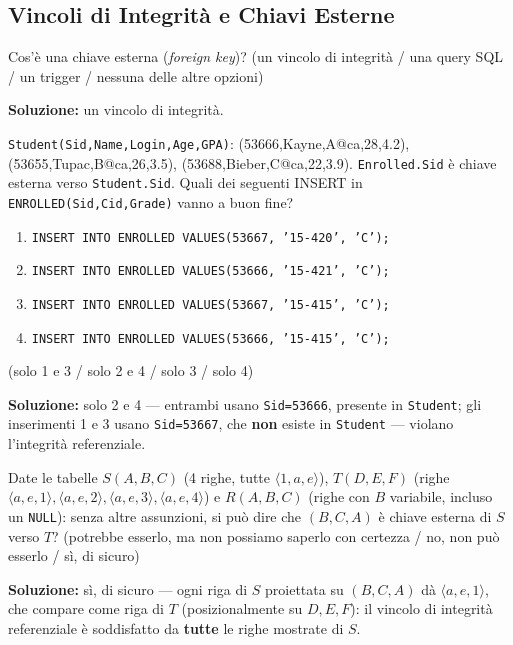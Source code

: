 \documentclass[12pt, a4paper]{article}
\begin{document}
\subsection{Vincoli di Integrità e Chiavi Esterne}

\begin{tcolorbox}[colback=lightergray!10, colframe=tocsec, title=\textbf{Esercizio 6}]
Cos'è una chiave esterna (\textit{foreign key})? (un vincolo di integrità / una query SQL / un trigger / nessuna delle altre opzioni)
\end{tcolorbox}
\textbf{Soluzione:} un vincolo di integrità.

\begin{tcolorbox}[colback=lightergray!10, colframe=tocsec, title=\textbf{Esercizio 7}]
\texttt{Student(Sid,Name,Login,Age,GPA)}: (53666,Kayne,A@ca,28,4.2), (53655,Tupac,B@ca,26,3.5), (53688,Bieber,C@ca,22,3.9). \texttt{Enrolled.Sid} è chiave esterna verso \texttt{Student.Sid}. Quali dei seguenti INSERT in \texttt{ENROLLED(Sid,Cid,Grade)} vanno a buon fine?
\begin{enumerate}
    \item[1.] \texttt{INSERT INTO ENROLLED VALUES(53667, '15-420', 'C');}
    \item[2.] \texttt{INSERT INTO ENROLLED VALUES(53666, '15-421', 'C');}
    \item[3.] \texttt{INSERT INTO ENROLLED VALUES(53667, '15-415', 'C');}
    \item[4.] \texttt{INSERT INTO ENROLLED VALUES(53666, '15-415', 'C');}
\end{enumerate}
(solo 1 e 3 / solo 2 e 4 / solo 3 / solo 4)
\end{tcolorbox}
\textbf{Soluzione:} solo 2 e 4 — entrambi usano \texttt{Sid=53666}, presente in \texttt{Student}; gli inserimenti 1 e 3 usano \texttt{Sid=53667}, che \textbf{non} esiste in \texttt{Student} — violano l'integrità referenziale.

\begin{tcolorbox}[colback=lightergray!10, colframe=tocsec, title=\textbf{Esercizio 8}]
Date le tabelle $S(A,B,C)$ (4 righe, tutte $\langle 1,a,e\rangle$), $T(D,E,F)$ (righe $\langle a,e,1\rangle,\langle a,e,2\rangle,\langle a,e,3\rangle,\langle a,e,4\rangle$) e $R(A,B,C)$ (righe con $B$ variabile, incluso un \texttt{NULL}): senza altre assunzioni, si può dire che $(B,C,A)$ è chiave esterna di $S$ verso $T$? (potrebbe esserlo, ma non possiamo saperlo con certezza / no, non può esserlo / sì, di sicuro)
\end{tcolorbox}
\textbf{Soluzione:} sì, di sicuro — ogni riga di $S$ proiettata su $(B,C,A)$ dà $\langle a,e,1\rangle$, che compare come riga di $T$ (posizionalmente su $D,E,F$): il vincolo di integrità referenziale è soddisfatto da \textbf{tutte} le righe mostrate di $S$.
\end{document}
